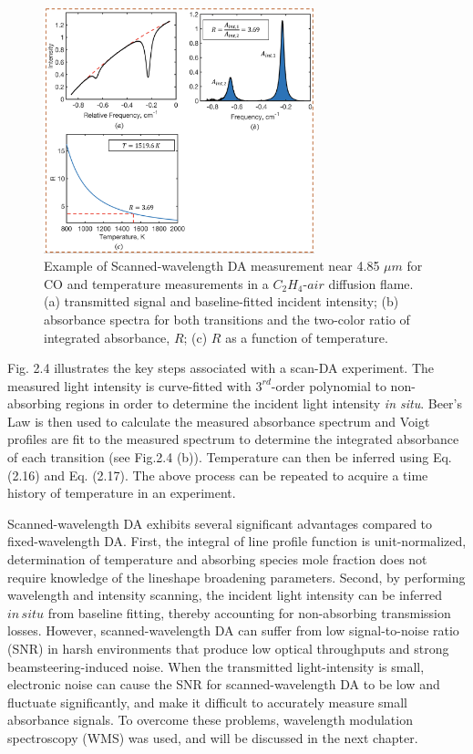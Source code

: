  \begin{figure}[h]
    \centering
        \includegraphics[width=0.7\textwidth]{fig/ch2_fig2_v3.png}
        \caption{Example of Scanned-wavelength DA measurement near 4.85 $\mu m$ for CO and temperature measurements in a $C_2H_4$-$air$ diffusion flame. (a) transmitted signal and baseline-fitted incident intensity; (b) absorbance spectra for both transitions and the two-color ratio of integrated absorbance, $R$; (c) $R$ as a function of temperature.}
    \label{fig:ch2_4}
\end{figure}

Fig. 2.4 illustrates the key steps associated with a scan-DA experiment. The measured light intensity is curve-fitted with $3^{rd}$-order polynomial to non-absorbing regions in order to determine the incident light intensity \textit{in situ}. Beer's Law is then used to calculate the measured absorbance spectrum and Voigt profiles are fit to the measured spectrum to determine the integrated absorbance of each transition (see Fig.2.4 (b)). Temperature can then be inferred using Eq. (2.16) and Eq. (2.17). The above process can be repeated to acquire a time history of temperature in an experiment. 

Scanned-wavelength DA exhibits several significant advantages compared to fixed-wavelength DA. First, the integral of line profile function is unit-normalized, determination of temperature and absorbing species mole fraction does not require knowledge of the lineshape broadening parameters. Second, by performing wavelength and intensity scanning, the incident light intensity can be inferred $in\,situ$ from baseline fitting, thereby accounting for non-absorbing transmission losses. However, scanned-wavelength DA can suffer from low signal-to-noise ratio (SNR) in harsh environments that produce low optical throughputs and strong beamsteering-induced noise. When the transmitted light-intensity is small, electronic noise can cause the SNR for scanned-wavelength DA to be low and fluctuate significantly, and make it difficult to accurately measure small absorbance signals. To overcome these problems, wavelength modulation spectroscopy (WMS) was used, and will be discussed in the next chapter.


